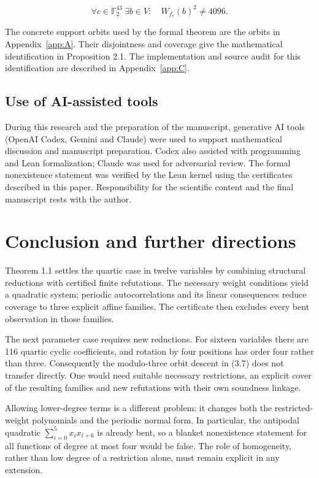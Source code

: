 \documentclass[pdflatex,sn-mathphys-num]{sn-jnl}
\begin{document}
\[
\forall c\in\mathbb F_2^{43}\ \exists b\in V:\quad W_{f_c}(b)^2\ne4096. \tag{5.1}
\]

The concrete support orbits used by the formal theorem are the orbits in Appendix~\ref{app:A}. Their disjointness and coverage give the mathematical identification in Proposition 2.1. The implementation and source audit for this identification are described in Appendix~\ref{app:C}.

\subsection{Use of AI-assisted tools}\label{subsec:5:3}

During this research and the preparation of the manuscript, generative AI tools (OpenAI Codex, Gemini and Claude) were used to support mathematical discussion and manuscript preparation. Codex also assisted with programming and Lean formalization; Claude was used for adversarial review. The formal nonexistence statement was verified by the Lean kernel using the certificates described in this paper. Responsibility for the scientific content and the final manuscript rests with the author.

\section{Conclusion and further directions}\label{sec:6}

Theorem 1.1 settles the quartic case in twelve variables by combining structural reductions with certified finite refutations. The necessary weight conditions yield a quadratic system; periodic autocorrelations and its linear consequences reduce coverage to three explicit affine families. The certificate then excludes every bent observation in those families.

The next parameter case requires new reductions. For sixteen variables there are 116 quartic cyclic coefficients, and rotation by four positions has order four rather than three. Consequently the modulo-three orbit descent in (3.7) does not transfer directly. One would need suitable necessary restrictions, an explicit cover of the resulting families and new refutations with their own soundness linkage.

Allowing lower-degree terms is a different problem: it changes both the restricted-weight polynomials and the periodic normal form. In particular, the antipodal quadratic $\sum_{i=0}^{5}x_ix_{i+6}$ is already bent, so a blanket nonexistence statement for all functions of degree at most four would be false. The role of homogeneity, rather than low degree of a restriction alone, must remain explicit in any extension.
\end{document}
